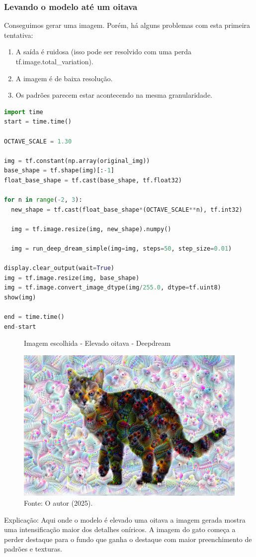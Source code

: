 \subsubsection*{Levando o modelo até um oitava}
Conseguimos gerar uma imagem. Porém, há alguns problemas com esta primeira tentativa:

\begin{enumerate}
    \item A saída é ruidosa (isso pode ser resolvido com uma perda tf.image.total\_variation).
    \item A imagem é de baixa resolução.
    \item Os padrões parecem estar acontecendo na mesma granularidade.
\end{enumerate}
\begin{lstlisting}[language=Python, style=input]
import time
start = time.time()

OCTAVE_SCALE = 1.30

img = tf.constant(np.array(original_img))
base_shape = tf.shape(img)[:-1]
float_base_shape = tf.cast(base_shape, tf.float32)

for n in range(-2, 3):
  new_shape = tf.cast(float_base_shape*(OCTAVE_SCALE**n), tf.int32)

  img = tf.image.resize(img, new_shape).numpy()

  img = run_deep_dream_simple(img=img, steps=50, step_size=0.01)

display.clear_output(wait=True)
img = tf.image.resize(img, base_shape)
img = tf.image.convert_image_dtype(img/255.0, dtype=tf.uint8)
show(img)

end = time.time()
end-start
\end{lstlisting}
\begin{figure}[H]
\centering
\caption{Imagem escolhida - Elevado oitava - Deepdream}
\includegraphics[width=.8\linewidth]{apendices/fig/13_IAA012_13.png}
\caption*{Fonte: O autor (2025).}
\end{figure}
Explicação: Aqui onde o modelo é elevado uma oitava a imagem gerada mostra uma intensificação maior dos detalhes oníricos. A imagem do gato começa a perder destaque para o fundo que ganha o destaque com maior preenchimento de padrões e texturas.

